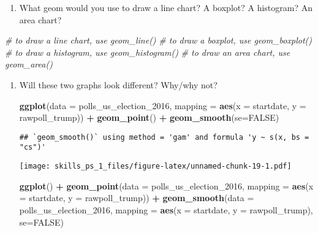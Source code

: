 \documentclass[
]{article}
\newenvironment{Shaded}{\begin{snugshade}}{\end{snugshade}}
\newcommand{\CommentTok}[1]{\textcolor[rgb]{0.56,0.35,0.01}{\textit{#1}}}
\newcommand{\DataTypeTok}[1]{\textcolor[rgb]{0.13,0.29,0.53}{#1}}
\newcommand{\DecValTok}[1]{\textcolor[rgb]{0.00,0.00,0.81}{#1}}
\newcommand{\KeywordTok}[1]{\textcolor[rgb]{0.13,0.29,0.53}{\textbf{#1}}}
\newcommand{\NormalTok}[1]{#1}
\newcommand{\OperatorTok}[1]{\textcolor[rgb]{0.81,0.36,0.00}{\textbf{#1}}}
\newcommand{\OtherTok}[1]{\textcolor[rgb]{0.56,0.35,0.01}{#1}}
\newcommand{\StringTok}[1]{\textcolor[rgb]{0.31,0.60,0.02}{#1}}
\providecommand{\tightlist}{%
  \setlength{\itemsep}{0pt}\setlength{\parskip}{0pt}}
\begin{document}
\begin{enumerate}
\def\labelenumi{\arabic{enumi}.}
\tightlist
\item
  What geom would you use to draw a line chart? A boxplot? A histogram?
  An area chart?
\end{enumerate}

\begin{Shaded}
\begin{Highlighting}[]
\CommentTok{# to draw a line chart, use geom_line()}
\CommentTok{# to draw a boxplot, use geom_boxplot()}
\CommentTok{# to draw a histogram, use geom_histogram()}
\CommentTok{# to draw an area chart, use geom_area()}
\end{Highlighting}
\end{Shaded}

\begin{enumerate}
\def\labelenumi{\arabic{enumi}.}
\item
  Will these two graphs look different? Why/why not?

\begin{Shaded}
\begin{Highlighting}[]
\KeywordTok{ggplot}\NormalTok{(}\DataTypeTok{data =}\NormalTok{ polls_us_election_}\DecValTok{2016}\NormalTok{, }
       \DataTypeTok{mapping =} \KeywordTok{aes}\NormalTok{(}\DataTypeTok{x =}\NormalTok{ startdate, }
                     \DataTypeTok{y =}\NormalTok{ rawpoll_trump)) }\OperatorTok{+}
\StringTok{  }\KeywordTok{geom_point}\NormalTok{() }\OperatorTok{+}
\StringTok{  }\KeywordTok{geom_smooth}\NormalTok{(}\DataTypeTok{se=}\OtherTok{FALSE}\NormalTok{)}
\end{Highlighting}
\end{Shaded}

\begin{verbatim}
## `geom_smooth()` using method = 'gam' and formula 'y ~ s(x, bs = "cs")'
\end{verbatim}

  \texttt{[image: skills\_ps\_1\_files/figure-latex/unnamed-chunk-19-1.pdf]}

\begin{Shaded}
\begin{Highlighting}[]
\KeywordTok{ggplot}\NormalTok{() }\OperatorTok{+}
\StringTok{  }\KeywordTok{geom_point}\NormalTok{(}\DataTypeTok{data =}\NormalTok{ polls_us_election_}\DecValTok{2016}\NormalTok{, }
             \DataTypeTok{mapping =} \KeywordTok{aes}\NormalTok{(}\DataTypeTok{x =}\NormalTok{ startdate, }
                           \DataTypeTok{y =}\NormalTok{ rawpoll_trump)) }\OperatorTok{+}
\StringTok{  }\KeywordTok{geom_smooth}\NormalTok{(}\DataTypeTok{data =}\NormalTok{ polls_us_election_}\DecValTok{2016}\NormalTok{, }
              \DataTypeTok{mapping =} \KeywordTok{aes}\NormalTok{(}\DataTypeTok{x =}\NormalTok{ startdate, }
                            \DataTypeTok{y =}\NormalTok{ rawpoll_trump), }\DataTypeTok{se=}\OtherTok{FALSE}\NormalTok{)}
\end{Highlighting}
\end{Shaded}


\end{enumerate}
\end{document}
